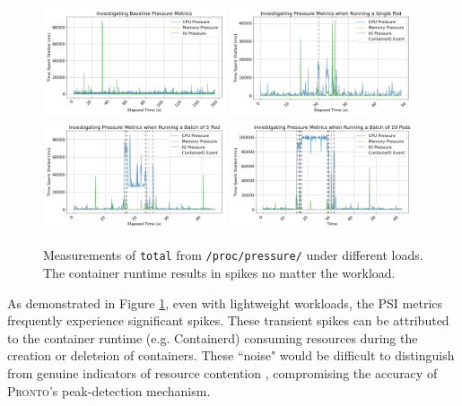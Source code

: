 \begin{figure}[ht]
    \centering
    \includegraphics[width=0.48\textwidth]{images/pressure-baseline.png}
    \includegraphics[width=0.48\textwidth]{images/pressure-single.png} \\
    \includegraphics[width=0.48\textwidth]{images/pressure-smallbatch.png}
    \includegraphics[width=0.48\textwidth]{images/pressure-bigbatch.png}
    \caption{Measurements of \texttt{total} from \texttt{/proc/pressure/} under
    different loads. The container runtime results in spikes no matter the
    workload.}
    \label{fig:pressure}
\end{figure}

As demonstrated in Figure \ref{fig:pressure}, even with lightweight workloads,
the PSI metrics frequently experience significant spikes. These transient spikes
can be attributed to the container runtime (e.g. Containerd) consuming resources
during the creation or deleteion of containers. These ``noise" would be
difficult to distinguish from genuine indicators of resource contention ,
compromising the accuracy of \textsc{Pronto}'s peak-detection mechanism.

